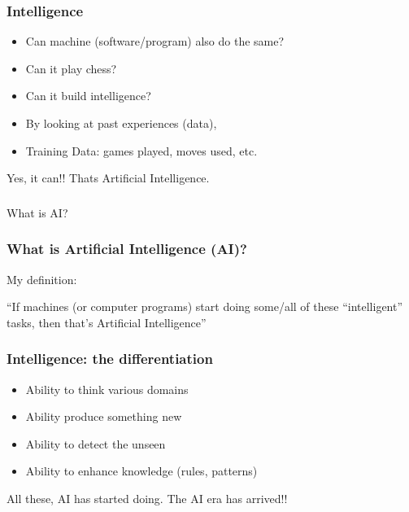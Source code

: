 \begin{frame}[fragile]\frametitle{Intelligence}
\begin{itemize}
\item Can machine (software/program) also do the same?
\item Can it play chess?
\item Can it build intelligence?
\item By looking at past experiences (data), 
\item Training Data: games played, moves used, etc.
\end{itemize}
Yes, it can!! Thats Artificial Intelligence.
\end{frame}

\begin{frame}[fragile]\frametitle{}
\begin{center}
{\Large What is AI?}
\end{center}
\end{frame}



\begin{frame}[fragile]\frametitle{ What is Artificial Intelligence (AI)?}
My definition:


``If machines (or computer programs) start doing some/all of these ``intelligent'' tasks, then that's Artificial Intelligence''

\end{frame}

\begin{frame}[fragile]\frametitle{ Intelligence: the differentiation}
\begin{itemize}
\item Ability to think various domains
\item Ability produce something new
\item Ability to detect the unseen
\item Ability to enhance knowledge (rules, patterns)
\end{itemize}
All these, AI has started doing. The AI era has arrived!!
\end{frame}


